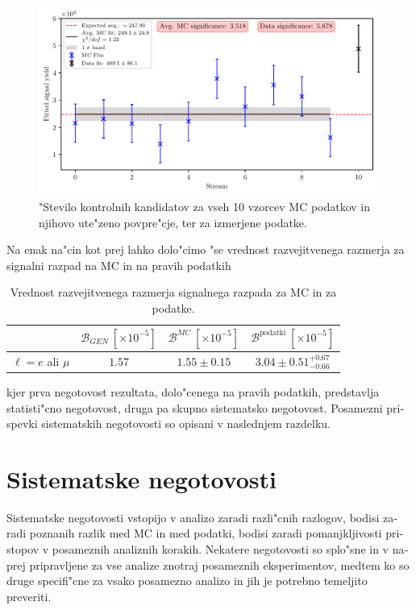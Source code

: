 \begin{otherlanguage}{slovene}
\begin{figure}[H]
	\centering
	\captionsetup{width=0.8\linewidth}
	\includegraphics[width=\linewidth]{fig/sig_global}
	\caption{"Stevilo kontrolnih kandidatov za vseh 10 vzorcev MC podatkov in njihovo ute"zeno povpre"cje, ter za izmerjene podatke.}
	\label{fig:sig_global_si}
\end{figure}

Na enak na"cin kot prej lahko dolo"cimo "se vrednost razvejitvenega razmerja za signalni razpad na MC in na pravih podatkih

\begin{table}[H]
	\centering
	\begin{tabular}{l|c|c|c}
		& $\mathcal{B}_{GEN}~[\times 10^{-5}]$ & $\mathcal{B}^{MC}~[\times 10^{-5}]$ & $\mathcal{B}^{\mathrm{podatki}}~[\times 10^{-5}]$ \\
		\toprule
		$\ell = e$ ali $\mu$ & $1.57$ & $1.55 \pm 0.15$ & $3.04 \pm 0.51 {}^{+0.67}_{-0.66}$\\
		\bottomrule
	\end{tabular}
	\captionsetup{width=.8\linewidth}
	\caption{Vrednost razvejitvenega razmerja signalnega razpada za MC in za podatke.}
\label{tab:br_result_sig_si}
\end{table}

kjer prva negotovost rezultata, dolo"cenega na pravih podatkih, predstavlja statisti"cno negotovost, druga pa skupno sistematsko negotovost. Posamezni prispevki sistematskih negotovosti so opisani v naslednjem razdelku.

\section{Sistematske negotovosti}

Sistematske negotovosti vstopijo v analizo zaradi razli"cnih razlogov, bodisi zaradi poznanih razlik med MC in med podatki, bodisi zaradi pomanjkljivosti pristopov v posameznih analiznih korakih. Nekatere negotovosti so splo"sne in v naprej pripravljene za vse analize znotraj posameznih eksperimentov, medtem ko so druge specifi"cne za vsako posamezno analizo in jih je potrebno temeljito preveriti. 


\end{otherlanguage}
